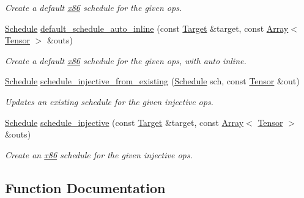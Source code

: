 \begin{DoxyCompactItemize}
\begin{DoxyCompactList}\small\item\em Create a default \hyperlink{namespacetopi_1_1x86}{x86} schedule for the given ops. \end{DoxyCompactList}\item 
\hyperlink{classtvm_1_1te_1_1Schedule}{Schedule} \hyperlink{namespacetopi_1_1x86_a699f4d04e5bb822785205e0d0f91063a}{default\+\_\+schedule\+\_\+auto\+\_\+inline} (const \hyperlink{classtvm_1_1Target}{Target} \&target, const \hyperlink{classtvm_1_1Array}{Array}$<$ \hyperlink{classtvm_1_1te_1_1Tensor}{Tensor} $>$ \&outs)
\begin{DoxyCompactList}\small\item\em Create a default \hyperlink{namespacetopi_1_1x86}{x86} schedule for the given ops, with auto inline. \end{DoxyCompactList}\item 
\hyperlink{classtvm_1_1te_1_1Schedule}{Schedule} \hyperlink{namespacetopi_1_1x86_a44cd9748bdc5bbd1e0b2a490cad7c159}{schedule\+\_\+injective\+\_\+from\+\_\+existing} (\hyperlink{classtvm_1_1te_1_1Schedule}{Schedule} sch, const \hyperlink{classtvm_1_1te_1_1Tensor}{Tensor} \&out)
\begin{DoxyCompactList}\small\item\em Updates an existing schedule for the given injective ops. \end{DoxyCompactList}\item 
\hyperlink{classtvm_1_1te_1_1Schedule}{Schedule} \hyperlink{namespacetopi_1_1x86_a850239c0d6385aa8a5b42dfe786d9d4d}{schedule\+\_\+injective} (const \hyperlink{classtvm_1_1Target}{Target} \&target, const \hyperlink{classtvm_1_1Array}{Array}$<$ \hyperlink{classtvm_1_1te_1_1Tensor}{Tensor} $>$ \&outs)
\begin{DoxyCompactList}\small\item\em Create an \hyperlink{namespacetopi_1_1x86}{x86} schedule for the given injective ops. \end{DoxyCompactList}\end{DoxyCompactItemize}


\subsection{Function Documentation}
